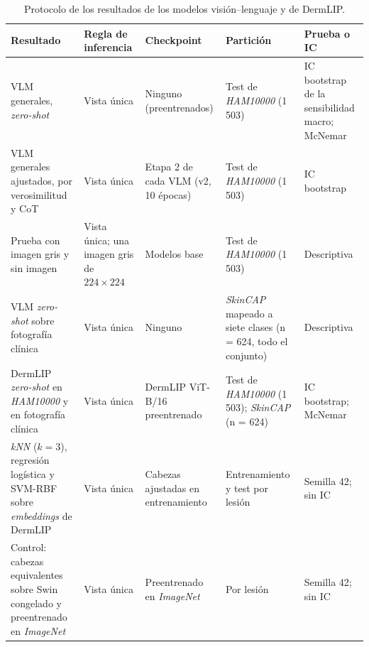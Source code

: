 \begingroup
\small
\setlength{\tabcolsep}{3pt}
\begin{table}[H]
    \centering
    \caption{Protocolo de los resultados de los modelos visión--lenguaje y de DermLIP.}
    \label{tab:met_protocolos_vlm}
    \begin{tabularx}{\textwidth}{@{}>{\raggedright\arraybackslash}p{3.6cm}
        >{\raggedright\arraybackslash\hspace{0pt}}X
        >{\raggedright\arraybackslash\hspace{0pt}}X
        >{\raggedright\arraybackslash\hspace{0pt}}X
        >{\raggedright\arraybackslash\hspace{0pt}}X@{}}
        \toprule
        \textbf{Resultado} & \textbf{Regla de inferencia} & \textbf{Checkpoint} & \textbf{Partición} & \textbf{Prueba o IC} \\
        \midrule
        VLM generales, \emph{zero-shot}
            & Vista única & Ninguno (preentrenados) & Test de \emph{HAM10000} (1\,503)
            & IC bootstrap de la sensibilidad macro; McNemar \\
        \filasep
        VLM generales ajustados, por verosimilitud y CoT
            & Vista única & Etapa 2 de cada VLM (v2, 10 épocas) & Test de \emph{HAM10000} (1\,503)
            & IC bootstrap \\
        \filasep
        Prueba con imagen gris y sin imagen
            & Vista única; una imagen gris de $224 \times 224$ & Modelos base & Test de \emph{HAM10000} (1\,503) & Descriptiva \\
        \filasep
        VLM \emph{zero-shot} sobre fotografía clínica
            & Vista única & Ninguno
            & \emph{SkinCAP} mapeado a siete clases (n = 624, todo el conjunto)
            & Descriptiva \\
        \filasep
        DermLIP \emph{zero-shot} en \emph{HAM10000} y en fotografía clínica
            & Vista única & DermLIP ViT-B/16 preentrenado
            & Test de \emph{HAM10000} (1\,503); \emph{SkinCAP} (n = 624)
            & IC bootstrap; McNemar \\
        \filasep
        \emph{kNN} ($k = 3$), regresión logística y SVM-RBF sobre \emph{embeddings} de DermLIP
            & Vista única & Cabezas ajustadas en entrenamiento & Entrenamiento y test por lesión & Semilla 42; sin IC \\
        \filasep
        Control: cabezas equivalentes sobre Swin congelado y preentrenado en \emph{ImageNet}
            & Vista única & Preentrenado en \emph{ImageNet} & Por lesión & Semilla 42; sin IC \\
        \bottomrule
    \end{tabularx}
\end{table}
\endgroup


